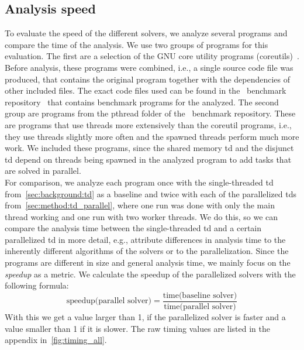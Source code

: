   \subsection{Analysis speed}
  \label{sec:eval:speed}
  To evaluate the speed of the different solvers, we analyze several programs and compare the time of the analysis. We use two groups of programs for this evaluation. The first are a selection of the GNU core utility programs (coreutils)~\cite{gnuCoreutils}. Before analysis, these programs were combined, i.e., a single source code file was produced, that contains the original program together with the dependencies of other included files. The exact code files used can be found in the \gob\ benchmark repository~\cite{goblintBench} that contains benchmark programs for the analyzed.
  The second group are programs from the pthread folder of the \gob\ benchmark repository. These are programs that use threads more extensively than the coreutil programs, i.e., they use threads slightly more often and the spawned threads perform much more work. We included these programs, since the shared memory \ac{td} and the disjunct \ac{td} depend on threads being spawned in the analyzed program to add tasks that are solved in parallel.\\
  For comparison, we analyze each program once with the single-threaded \ac{td} from~\autoref{sec:background:td} as a baseline and twice with each of the parallelized \acp{td} from~\autoref{sec:method:td_parallel}, where one run was done with only the main thread working and one run with two worker threads. We do this, so we can compare the analysis time between the single-threaded \ac{td} and a certain parallelized \ac{td} in more detail, e.g., attribute differences in analysis time to the inherently different algorithms of the solvers or to the parallelization. Since the programs are different in size and general analysis time, we mainly focus on the \textit{speedup} as a metric. We calculate the speedup of the parallelized solvers with the following formula:
  \begin{equation*}
    \text{speedup(parallel solver)} = \frac{\text{time(baseline solver)}}{\text{time(parallel solver)}}
  \end{equation*}
  With this we get a value larger than 1, if the parallelized solver is faster and a value smaller than 1 if it is slower. The raw timing values are listed in the appendix in~\autoref{fig:timing_all}.

